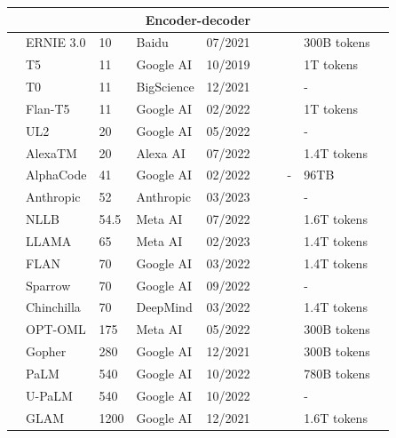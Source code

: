 \begin{landscape}
\begin{longtable}{|l|l|l|l|l|l|l|l|l|l|}
		\multicolumn{10}{|c|}{\textbf{Encoder-decoder}} \\
		\hline
		& ERNIE 3.0 & 10 & Baidu & 07/2021 & \xmark & \cmark & \cmark & 300B tokens & \xmark \\
		& T5 & 11 & Google AI & 10/2019 & \cmark & \cmark & \cmark & 1T tokens & \cmark \\
		& T0 & 11 & BigScience & 12/2021 & \cmark & \cmark & \cmark & - & \cmark \\
		& Flan-T5 & 11 & Google AI & 02/2022 & \cmark & \cmark & \cmark & 1T tokens & \cmark \\
		& UL2 & 20 & Google AI & 05/2022 & \xmark & \cmark & \cmark & - & \xmark \\
		& AlexaTM & 20 & Alexa AI & 07/2022 & \xmark & \cmark & \cmark & 1.4T tokens & \xmark \\
		& AlphaCode & 41 & Google AI & 02/2022 & \xmark & \xmark & - & 96TB & \xmark \\
		& Anthropic & 52 & Anthropic & 03/2023 & \xmark & \cmark & \cmark & - & \xmark \\
		& NLLB & 54.5 & Meta AI & 07/2022 & \cmark & \cmark & \xmark & 1.6T tokens & \cmark \\
		& LLAMA & 65 & Meta AI & 02/2023 & \cmark & \cmark & \xmark & 1.4T tokens & \cmark \\
		& FLAN & 70 & Google AI & 03/2022 & \cmark & \cmark & \cmark & 1.4T tokens & \cmark \\
		& Sparrow & 70 & Google AI & 09/2022 & \xmark & \cmark & \cmark & - & \xmark \\
		& Chinchilla & 70 & DeepMind & 03/2022 & \xmark & \cmark & \xmark & 1.4T tokens & \xmark \\
		& OPT-OML & 175 & Meta AI & 05/2022 & \cmark & \cmark & \xmark & 300B tokens & \cmark \\
		& Gopher & 280 & Google AI & 12/2021 & \xmark & \cmark & \xmark & 300B tokens & \xmark \\
		& PaLM & 540 & Google AI & 10/2022 & \xmark & \cmark & \cmark & 780B tokens & \xmark \\
		& U-PaLM & 540 & Google AI & 10/2022 & \xmark & \cmark & \cmark & - & \xmark \\
		& GLAM & 1200 & Google AI & 12/2021 & \xmark & \cmark & \xmark & 1.6T tokens & \xmark \\
		\hline
		

\end{longtable}
\end{landscape}
